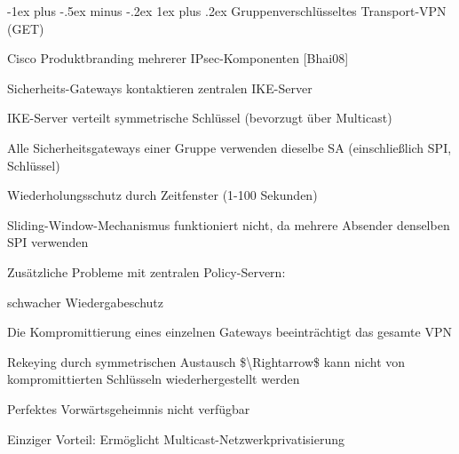 \documentclass[a4paper]{article}
\makeatletter
\renewcommand{\subsubsection}{\@startsection{subsubsection}{3}{0mm}%
 {-1ex plus -.5ex minus -.2ex}%
 {1ex plus .2ex}%
 {\normalfont\small\bfseries}}
\makeatother
\begin{document}
\begin{multicols}{3}
\begin{itemize*}
            \subsubsection{Gruppenverschlüsseltes Transport-VPN
                  (GET)}
            \begin{itemize*}
                  \item       Cisco Produktbranding mehrerer IPsec-Komponenten {[}Bhai08{]}
                  \item       Sicherheits-Gateways kontaktieren zentralen IKE-Server
                  \item       IKE-Server verteilt symmetrische Schlüssel (bevorzugt über Multicast)
                  \item       Alle Sicherheitsgateways einer Gruppe verwenden dieselbe SA
                  (einschließlich SPI, Schlüssel)
                  \item       Wiederholungsschutz durch Zeitfenster (1-100 Sekunden)
                  \begin{itemize*}
                        \item Sliding-Window-Mechanismus funktioniert nicht, da mehrere Absender denselben SPI verwenden
                  \end{itemize*}
                  \item       Zusätzliche Probleme mit zentralen Policy-Servern:
                  \begin{itemize*}
                        \item schwacher Wiedergabeschutz
                        \item Die Kompromittierung eines einzelnen Gateways beeinträchtigt das gesamte VPN
                        \item Rekeying durch symmetrischen Austausch \$\textbackslash Rightarrow\$ kann nicht von kompromittierten Schlüsseln wiederhergestellt werden
                        \item Perfektes Vorwärtsgeheimnis nicht verfügbar
                  \end{itemize*}
                  \item       Einziger Vorteil: Ermöglicht Multicast-Netzwerkprivatisierung
            \end{itemize*}


\end{itemize*}
\end{multicols}
\end{document}
